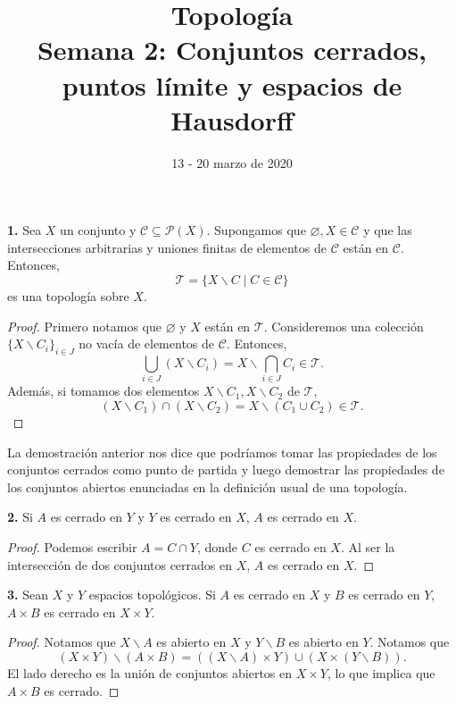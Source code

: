 \documentclass{article}
\begin{document}
\date{13 - 20 marzo de 2020}
\title{ \textbf{Topología} \\
Semana 2: Conjuntos cerrados, puntos límite y espacios de Hausdorff}
\maketitle	
\begin{mybox}
	\textbf{1.} Sea $X$ un conjunto y $\mathcal{C} \subseteq \mathcal{P}(X)$. Supongamos que $\varnothing, X \in \mathcal{C}$ y que las intersecciones arbitrarias y uniones finitas de elementos de $\mathcal{C}$ están en $\mathcal{C}$. Entonces, 
	$$ \mathcal{T} = \{ X \backslash C \mid C \in \mathcal{C} \} $$ 
	es una topología sobre $X$.
\end{mybox}	 
\begin{proof}
Primero notamos que $\varnothing$ y $X$ están en $\mathcal{T}$. Consideremos una colección $\{ X \backslash C_{i} \}_{i \in J}$ no vacía de elementos de $\mathcal{C}$. Entonces, 
$$ \bigcup _{i \in J} \left( X \backslash C_{i} \right)  = X \backslash \bigcap_{i \in J} C_{i} \in \mathcal{T}.$$
Además, si tomamos dos elementos $X\backslash C_{1}, X\backslash C_{2}$ de $\mathcal{T}$,
$$ (X \backslash C_{1}) \cap (X \backslash C_{2}) = X \backslash \left( C_{1} \cup C_{2} \right) \in \mathcal{T}. $$
\end{proof}

La demostración anterior nos dice que podríamos tomar las propiedades de los conjuntos cerrados como punto de partida y luego demostrar las propiedades de los conjuntos abiertos enunciadas en la definición usual de una topología. \\

\begin{mybox}
	\textbf{2. } Si $A$ es cerrado en $Y$ y $Y$ es cerrado en $X$, $A$ es cerrado en $X$.
\end{mybox}	
\begin{proof}
Podemos escribir $A = C \cap Y$, donde $C$ es cerrado en $X$. Al ser la intersección de dos conjuntos cerrados en $X$, $A$ es cerrado en $X$. 
\end{proof}
\begin{mybox}
	\textbf{3. } Sean $X$ y $Y$ espacios topológicos. Si $A$ es cerrado en $X$ y $B$ es cerrado en $Y$, $A \times B$ es cerrado en $X \times Y$. 
\end{mybox}	
\begin{proof}
	Notamos que $X \backslash A$ es abierto en $X$ y $Y \backslash B$ es abierto en $Y$. Notamos que 
	$$ \left( X \times Y \right) \backslash \left( A \times B \right) =   \left( \left( X \backslash A \right) \times Y \right) \cup \left( X \times \left( Y \backslash B \right) \right). $$
	El lado derecho es la unión de conjuntos abiertos en $X \times Y$, lo que implica que $A \times B$ es cerrado.  
\end{proof}
\end{document}

